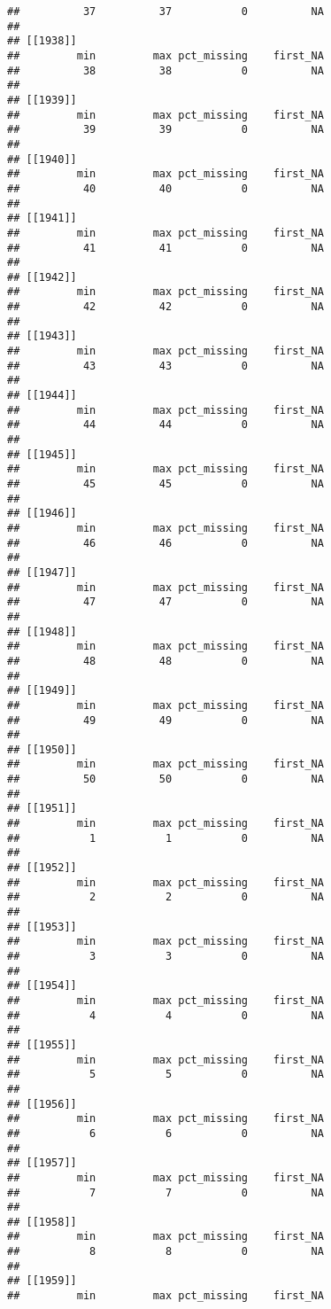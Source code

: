 \documentclass[
]{article}
\begin{document}
\begin{verbatim}
##          37          37           0          NA 
## 
## [[1938]]
##         min         max pct_missing    first_NA 
##          38          38           0          NA 
## 
## [[1939]]
##         min         max pct_missing    first_NA 
##          39          39           0          NA 
## 
## [[1940]]
##         min         max pct_missing    first_NA 
##          40          40           0          NA 
## 
## [[1941]]
##         min         max pct_missing    first_NA 
##          41          41           0          NA 
## 
## [[1942]]
##         min         max pct_missing    first_NA 
##          42          42           0          NA 
## 
## [[1943]]
##         min         max pct_missing    first_NA 
##          43          43           0          NA 
## 
## [[1944]]
##         min         max pct_missing    first_NA 
##          44          44           0          NA 
## 
## [[1945]]
##         min         max pct_missing    first_NA 
##          45          45           0          NA 
## 
## [[1946]]
##         min         max pct_missing    first_NA 
##          46          46           0          NA 
## 
## [[1947]]
##         min         max pct_missing    first_NA 
##          47          47           0          NA 
## 
## [[1948]]
##         min         max pct_missing    first_NA 
##          48          48           0          NA 
## 
## [[1949]]
##         min         max pct_missing    first_NA 
##          49          49           0          NA 
## 
## [[1950]]
##         min         max pct_missing    first_NA 
##          50          50           0          NA 
## 
## [[1951]]
##         min         max pct_missing    first_NA 
##           1           1           0          NA 
## 
## [[1952]]
##         min         max pct_missing    first_NA 
##           2           2           0          NA 
## 
## [[1953]]
##         min         max pct_missing    first_NA 
##           3           3           0          NA 
## 
## [[1954]]
##         min         max pct_missing    first_NA 
##           4           4           0          NA 
## 
## [[1955]]
##         min         max pct_missing    first_NA 
##           5           5           0          NA 
## 
## [[1956]]
##         min         max pct_missing    first_NA 
##           6           6           0          NA 
## 
## [[1957]]
##         min         max pct_missing    first_NA 
##           7           7           0          NA 
## 
## [[1958]]
##         min         max pct_missing    first_NA 
##           8           8           0          NA 
## 
## [[1959]]
##         min         max pct_missing    first_NA 

\end{verbatim}
\end{document}
